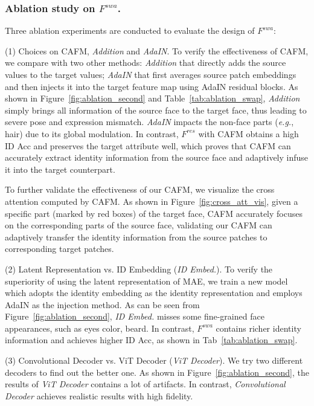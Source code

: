 \subsubsection{Ablation study on $F^{swa}$.}
Three ablation experiments are conducted to evaluate the design of $F^{swa}$:
 
(1) Choices on CAFM, \textit{Addition} and \textit{AdaIN}. To verify the effectiveness of CAFM, we compare with two other methods: \textit{Addition} that directly adds the source values to the target values; \textit{AdaIN} that first averages source patch embeddings and then injects it into the target feature map using AdaIN residual blocks.
As shown in Figure~\ref{fig:ablation_second} and Table~\ref{tab:ablation_swap}, \textit{Addition} simply brings all information of the source face to the target face, thus leading to severe pose and expression mismatch. \textit{AdaIN} impacts the non-face parts (\emph{e.g.}, hair) due to its global modulation. In contrast, $F^{res}$ with CAFM obtains a high ID Acc and preserves the target attribute well, which proves that CAFM can accurately extract identity information from the source face and adaptively infuse it into the target counterpart. 

To further validate the effectiveness of our CAFM, we visualize the cross attention computed by CAFM. As shown in Figure~\ref{fig:cross_att_vis}, given a specific part (marked by red boxes) of the target face, CAFM accurately focuses on the corresponding parts of the source face, validating our CAFM can adaptively transfer the identity information from the source patches to corresponding target patches.

(2) Latent Representation vs. ID Embedding (\textit{ID Embed.}). 
To verify the superiority of using the latent representation of MAE, we train a new model which adopts the identity embedding as the identity representation and employs AdaIN as the injection method.
As can be seen from Figure~\ref{fig:ablation_second}, \textit{ID Embed.} misses some fine-grained face appearances, such as eyes color, beard. 
In contrast, $F^{swa}$ contains richer identity information and achieves higher ID Acc, as shown in Tab~\ref{tab:ablation_swap}.

(3) Convolutional Decoder vs. ViT Decoder (\textit{ViT Decoder}). 
We try two different decoders to find out the better one.
As shown in Figure~\ref{fig:ablation_second}, the results of \textit{ViT Decoder} contains a lot of artifacts. 
In contrast, \textit{Convolutional Decoder} achieves realistic results with high fidelity. 


